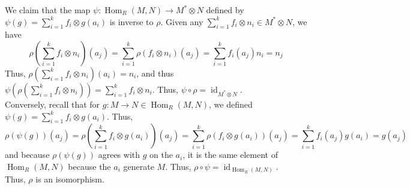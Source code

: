\documentclass[11pt]{article}
\newcommand{\id}{\operatorname{id}}
\newcommand{\Hom}{\operatorname{Hom}}
\theoremstyle{definition}
\begin{document}
\noindent We claim that the map $\psi:\Hom_R(M,N)\rightarrow M^*\otimes N$ defined by $\psi(g)=\sum_{i=1}^k f_i\otimes g(a_i)$ is inverse to $\rho$. Given any $\sum_{i=1}^k f_i\otimes n_i\in M^*\otimes N$, we have 
\[\rho(\sum_{i=1}^k f_i\otimes n_i)(a_j)=\sum_{i=1}^k\rho(f_i\otimes n_i)(a_j)=\sum_{i=1}^kf_i(a_j)n_i=n_j\]
 Thus, $\rho(\sum_{i=1}^k f_i\otimes n_i)(a_i)=n_i$, and thus $\psi(\rho(\sum_{i=1}^k f_i\otimes n_i))=\sum_{i=1}^k f_i\otimes n_i$. Thus, $\psi\circ\rho=\id_{M^*\otimes N}$.\\
 
 \noindent Conversely, recall that for $g:M\rightarrow N\in\Hom_R(M,N)$, we defined $\psi(g)=\sum_{i=1}^k f_i\otimes g(a_i)$. Thus, 
\[\rho(\psi(g))(a_j)=\rho(\sum_{i=1}^k f_i\otimes g(a_i))(a_j)=\sum_{i=1}^k\rho(f_i\otimes g(a_i))(a_j)=\sum_{i=1}^k f_i(a_j)g(a_i)=g(a_j)\]
and because $\rho(\psi(g))$ agrees with $g$ on the $a_i$, it is the same element of $\Hom_R(M,N)$ because the $a_i$ generate $M$. Thus, $\rho\circ\psi=\id_{\Hom_R(M,N)}$.\\

\noindent Thus, $\rho$ is an isomorphism.
\end{document}
